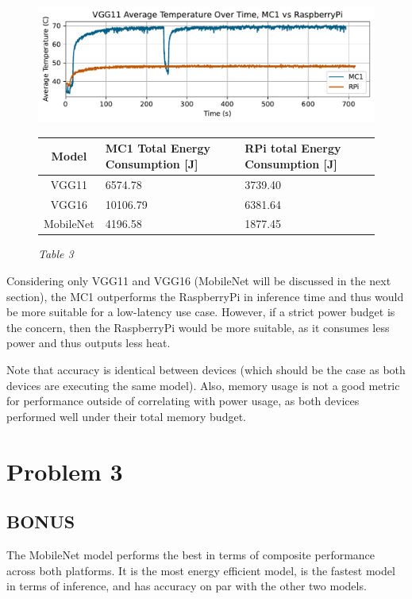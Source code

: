 \documentclass{article}
\begin{document}
\begin{figure}[!htb]
    \centering
    \includegraphics[width=\textwidth]{vgg11_average_temperature.pdf}
    \caption{}
    \label{fig:vgg11-avg-temp}
\end{figure}
\clearpage
\begin{figure}[!htb]
    \caption{\textit{Table 3}}
    \begin{tabularx}{\textwidth}{|c|*{2}{Y|}}
        \hline
        Model & MC1 Total Energy Consumption [J] & RPi total Energy Consumption [J] \\
        \hline
        VGG11 & 6574.78 & 3739.40 \\
        \hline
        VGG16 & 10106.79 & 6381.64 \\
        \hline
        MobileNet & 4196.58 & 1877.45 \\
        \hline
    \end{tabularx}
    \label{fig:deploy-energy}
\end{figure}

Considering only VGG11 and VGG16 (MobileNet will be discussed in the next section), the MC1 outperforms the RaspberryPi in inference time and thus would be more suitable for a low-latency use case. However, if a strict power budget is the concern, then the RaspberryPi would be more suitable, as it consumes less power and thus outputs less heat.

Note that accuracy is identical between devices (which should be the case as both devices are executing the same model). Also, memory usage is not a good metric for performance outside of correlating with power usage, as both devices performed well under their total memory budget.

\section*{Problem 3}
\subsection*{BONUS}
The MobileNet model performs the best in terms of composite performance across both platforms.
It is the most energy efficient model, is the fastest model in terms of inference, and has 
accuracy on par with the other two models.
\end{document}
